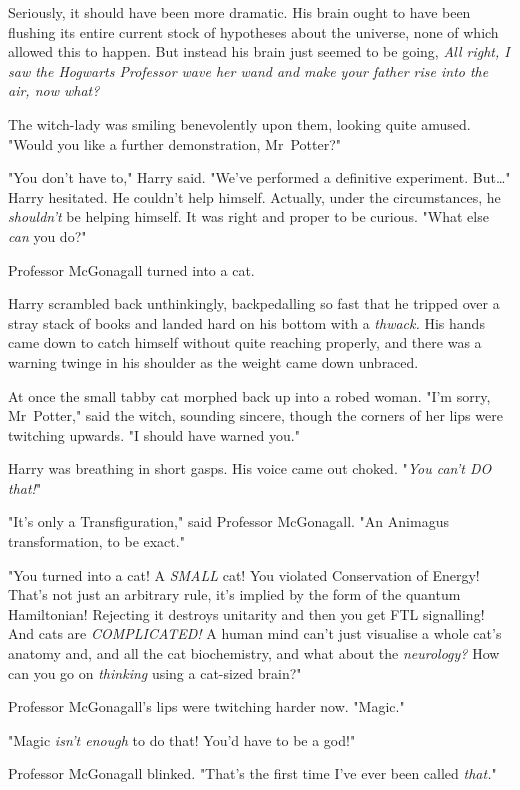 Seriously, it should have been more dramatic. His brain ought to have been
flushing its entire current stock of hypotheses about the universe, none of
which allowed this to happen. But instead his brain just seemed to be going,
\emph{All right, I saw the Hogwarts Professor wave her wand and make your
father rise into the air, now what?}

The witch-lady was smiling benevolently upon them, looking quite amused. "Would
you like a further demonstration, Mr~Potter?"

"You don't have to," Harry said. "We've performed a definitive experiment.
But{\ldots}" Harry hesitated. He couldn't help himself. Actually, under the
circumstances, he \emph{shouldn't} be helping himself. It was right and proper
to be curious. "What else \emph{can} you do?"

Professor McGonagall turned into a cat.

Harry scrambled back unthinkingly, backpedalling so fast that he tripped over a
stray stack of books and landed hard on his bottom with a \emph{thwack.} His
hands came down to catch himself without quite reaching properly, and there was
a warning twinge in his shoulder as the weight came down unbraced.

At once the small tabby cat morphed back up into a robed woman. "I'm sorry,
Mr~Potter," said the witch, sounding sincere, though the corners of her lips
were twitching upwards. "I should have warned you."

Harry was breathing in short gasps. His voice came out choked. "\emph{You can't
DO that!}"

"It's only a Transfiguration," said Professor McGonagall. "An Animagus
transformation, to be exact."

"You turned into a cat! A \emph{SMALL} cat! You violated Conservation of
Energy! That's not just an arbitrary rule, it's implied by the form of the
quantum Hamiltonian! Rejecting it destroys unitarity and then you get FTL
signalling! And cats are \emph{COMPLICATED!} A human mind can't just visualise
a whole cat's anatomy and, and all the cat biochemistry, and what about the
\emph{neurology?} How can you go on \emph{thinking} using a cat-sized brain?"

Professor McGonagall's lips were twitching harder now. "Magic."

"Magic \emph{isn't enough} to do that! You'd have to be a god!"

Professor McGonagall blinked. "That's the first time I've ever been called
\emph{that.}"

